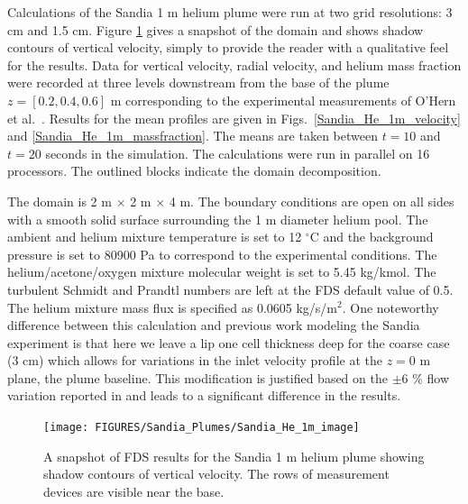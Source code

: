 Calculations of the Sandia 1 m helium plume were run at two grid resolutions: 3 cm and 1.5 cm.  Figure \ref{Sandia_He_1m_image} gives a snapshot of the domain and shows shadow contours of vertical velocity, simply to provide the reader with a qualitative feel for the results. Data for vertical velocity, radial velocity, and helium mass fraction were recorded at three levels downstream from the base of the plume $z = [0.2, 0.4, 0.6]$ m corresponding to the experimental measurements of O'Hern et al.~\cite{OHern:2005}.  Results for the mean profiles are given in Figs.~\ref{Sandia_He_1m_velocity} and \ref{Sandia_He_1m_massfraction}.  The means are taken between $t=10$ and $t=20$ seconds in the simulation. The calculations were run in parallel on 16 processors.  The outlined blocks indicate the domain decomposition.

The domain is 2 m $\times$ 2 m $\times$ 4 m. The boundary conditions are open on all sides with a smooth solid surface surrounding the 1 m diameter helium pool.  The ambient and helium mixture temperature is set to 12 $^\circ$C and the background pressure is set to 80900 Pa to correspond to the experimental conditions.  The helium/acetone/oxygen mixture molecular weight is set to 5.45 kg/kmol.  The turbulent Schmidt and Prandtl numbers are left at the FDS default value of 0.5.  The helium mixture mass flux is specified as 0.0605 kg/s/m$^2$.  One noteworthy difference between this calculation and previous work modeling the Sandia experiment is that here we leave a lip one cell thickness deep for the coarse case (3 cm) which allows for variations in the inlet velocity profile at the $z=0$ m plane, the plume baseline.  This modification is justified based on the $\pm 6$ \% flow variation reported in \cite{Blanchat:2001} and leads to a significant difference in the results.

\begin{figure}[h]
\begin{center}
\texttt{[image: FIGURES/Sandia\_Plumes/Sandia\_He\_1m\_image]}
\caption[Sandia 1~m helium plume image.]{A snapshot of FDS results for the Sandia 1 m helium plume showing shadow contours of vertical velocity.  The rows of measurement devices are visible near the base.}
\label{Sandia_He_1m_image}
\end{center}
\end{figure}

\newpage

